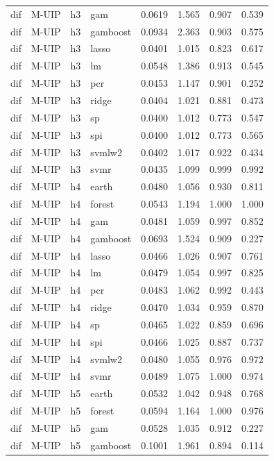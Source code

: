 \begin{ThreePartTable}
\begin{longtable}[t]{llclcccc}
dif & M-UIP & h3 & gam & 0.0619 & 1.565 & 0.907 & 0.539\\
dif & M-UIP & h3 & gamboost & 0.0934 & 2.363 & 0.903 & 0.575\\
dif & M-UIP & h3 & lasso & 0.0401 & 1.015 & 0.823 & 0.617\\
dif & M-UIP & h3 & lm & 0.0548 & 1.386 & 0.913 & 0.545\\
dif & M-UIP & h3 & pcr & 0.0453 & 1.147 & 0.901 & 0.252\\
dif & M-UIP & h3 & ridge & 0.0404 & 1.021 & 0.881 & 0.473\\
dif & M-UIP & h3 & sp & 0.0400 & 1.012 & 0.773 & 0.547\\
dif & M-UIP & h3 & spi & 0.0400 & 1.012 & 0.773 & 0.565\\
dif & M-UIP & h3 & svmlw2 & 0.0402 & 1.017 & 0.922 & 0.434\\
dif & M-UIP & h3 & svmr & 0.0435 & 1.099 & 0.999 & 0.992\\
\addlinespace
dif & M-UIP & h4 & earth & 0.0480 & 1.056 & 0.930 & 0.811\\
dif & M-UIP & h4 & forest & 0.0543 & 1.194 & 1.000 & 1.000\\
dif & M-UIP & h4 & gam & 0.0481 & 1.059 & 0.997 & 0.852\\
dif & M-UIP & h4 & gamboost & 0.0693 & 1.524 & 0.909 & 0.227\\
dif & M-UIP & h4 & lasso & 0.0466 & 1.026 & 0.907 & 0.761\\
dif & M-UIP & h4 & lm & 0.0479 & 1.054 & 0.997 & 0.825\\
dif & M-UIP & h4 & pcr & 0.0483 & 1.062 & 0.992 & 0.443\\
dif & M-UIP & h4 & ridge & 0.0470 & 1.034 & 0.959 & 0.870\\
dif & M-UIP & h4 & sp & 0.0465 & 1.022 & 0.859 & 0.696\\
dif & M-UIP & h4 & spi & 0.0466 & 1.025 & 0.887 & 0.737\\
dif & M-UIP & h4 & svmlw2 & 0.0480 & 1.055 & 0.976 & 0.972\\
dif & M-UIP & h4 & svmr & 0.0489 & 1.075 & 1.000 & 0.974\\
\addlinespace
dif & M-UIP & h5 & earth & 0.0532 & 1.042 & 0.948 & 0.768\\
dif & M-UIP & h5 & forest & 0.0594 & 1.164 & 1.000 & 0.976\\
dif & M-UIP & h5 & gam & 0.0528 & 1.035 & 0.912 & 0.227\\
dif & M-UIP & h5 & gamboost & 0.1001 & 1.961 & 0.894 & 0.114\\

\end{longtable}
\end{ThreePartTable}
